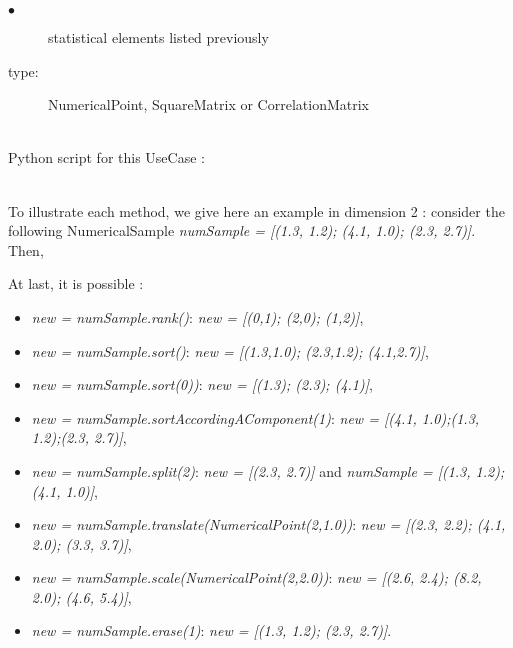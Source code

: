             {
               \begin{description}
               \item[$\bullet$] statistical elements listed previously
               \item[type:]  NumericalPoint, SquareMatrix or CorrelationMatrix
               \end{description}
             }

             \textspace\\
             Python script for this UseCase :


             \textspace\\



             To illustrate each method, we give here an example in dimension 2 : consider the following NumericalSample \textit{numSample = [(1.3, 1.2); (4.1, 1.0); (2.3, 2.7)]}. Then,

             At last, it is possible :
             \begin{itemize}
             \item \textit{new = numSample.rank()}: \textit{new = [(0,1); (2,0); (1,2)]},
             \item \textit{new = numSample.sort()}: \textit{new = [(1.3,1.0); (2.3,1.2); (4.1,2.7)]},
             \item \textit{new = numSample.sort(0))}: \textit{new = [(1.3); (2.3); (4.1)]},
             \item \textit{new = numSample.sortAccordingAComponent(1)}: \textit{new  = [(4.1, 1.0);(1.3, 1.2);(2.3, 2.7)]},
             \item \textit{new = numSample.split(2)}: \textit{new  = [(2.3, 2.7)]} and \textit{numSample = [(1.3, 1.2); (4.1, 1.0)]},
             \item \textit{new = numSample.translate(NumericalPoint(2,1.0))}: \textit{new  = [(2.3, 2.2); (4.1, 2.0); (3.3, 3.7)]},
             \item \textit{new = numSample.scale(NumericalPoint(2,2.0))}: \textit{new  = [(2.6, 2.4); (8.2, 2.0); (4.6, 5.4)]},
             \item \textit{new = numSample.erase(1)}: \textit{new  = [(1.3, 1.2); (2.3, 2.7)]}.
             \end{itemize}
